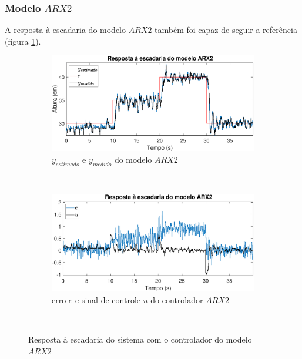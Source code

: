 \subsubsection{Modelo $ARX2$}
A resposta à escadaria do modelo $ARX2$ também foi capaz de seguir a referência (figura \ref{fig:stairrarx2y}).

\begin{figure}[htb]
	\centering
	\begin{subfigure}[t]{0.48\textwidth}
		\includegraphics[width=1\linewidth]{stairrarx2y}
		\caption[$y_{estimado}$ e $y_{medido}$ do modelo $ARX2$]{$y_{estimado}$ e $y_{medido}$ do modelo $ARX2$}
		\label{fig:stairrarx2y}
	\end{subfigure}
	~ %
	\begin{subfigure}[t]{0.48\textwidth}
		\includegraphics[width=1\linewidth]{stairrarx2e}
		\caption[erro $e$ e sinal de controle $u$ do controlador $ARX2$]{erro $e$ e sinal de controle $u$ do controlador $ARX2$}
		\label{fig:stairrarx2e}
	\end{subfigure}
	~ %
	
	\caption{Resposta à escadaria do sistema com o controlador do modelo $ARX2$}\label{fig:stairrarx2}
\end{figure}

